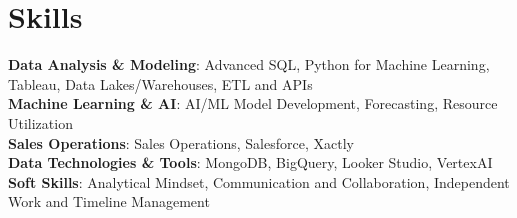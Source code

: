 \section{Skills}
  \begin{itemize}[leftmargin=0.1in, label={}]
    \normalsize{\item{
      \textbf{Data Analysis \& Modeling}: Advanced SQL, Python for Machine Learning, Tableau, Data Lakes/Warehouses, ETL and APIs \\
      \textbf{Machine Learning \& AI}: AI/ML Model Development, Forecasting, Resource Utilization \\
      \textbf{Sales Operations}: Sales Operations, Salesforce, Xactly \\
      \textbf{Data Technologies \& Tools}: MongoDB, BigQuery, Looker Studio, VertexAI \\
      \textbf{Soft Skills}: Analytical Mindset, Communication and Collaboration, Independent Work and Timeline Management \\
     }}
  \end{itemize}
